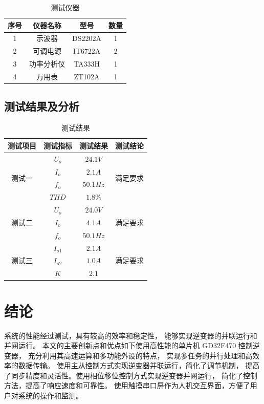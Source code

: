 \documentclass[a4paper,12pt]{article}
\begin{document}
\begin{table}[h]
    \centering
    \begin{tabular}{cccc}
    \toprule
    序号 & 仪器名称 & 型号 & 数量  \\ \midrule
    1 & 示波器 & DS2202A & 1\\
    2 & 可调电源 & IT6722A & 2 \\
    3 & 功率分析仪 & TA333H & 1 \\
    4 & 万用表 &  ZT102A & 1
    \\ \bottomrule
    \end{tabular}
    \caption{测试仪器}
\end{table}
\newpage
\subsection{测试结果及分析}
\begin{table}[h]
    \centering
    \begin{tabular}{@{}cccc@{}}
    \toprule
    测试项目 & 测试指标 & 测试结果 & 测试结论 \\ \midrule
    \multirow{4}{*}{测试一} & $U_o$ & $24.1V$ & \multirow{4}{*}{满足要求} \\
     & $I_o$ & $2.1A$ &  \\
     & $f_o$ & $50.1Hz$ &  \\
     & $THD$ & $1.8\%$ &  \\ \midrule
    \multirow{3}{*}{测试二} & $U_o$ & $24.0V$ & \multirow{3}{*}{满足要求} \\
        & $I_o$ & $4.1A$ &  \\
        & $f_o$ & $50.1Hz$ &  \\ \midrule
    \multirow{3}{*}{测试三} & $I_{o1}$ & $2.1A$ & \multirow{3}{*}{满足要求} \\
        & $I_{o2}$ & $1.0A$ &  \\
        & $K$ & $2.1$ &  \\ \bottomrule
    \end{tabular}
    \caption{测试结果}
\end{table}

\section{结论}
系统的性能经过测试，具有较高的效率和稳定性，
能够实现逆变器的并联运行和并网运行。
本文的主要创新点和优点如下使用高性能的单片机 GD32F470 控制逆变器，
充分利用其高速运算和多功能外设的特点，
实现多任务的并行处理和高效率的数据传输。
使用主从控制方式实现逆变器并联运行，简化了调节机制，
提高了同步精度和灵活性。使用相位移位控制方式实现逆变器并网运行，
简化了控制方法，提高了响应速度和可靠性。
使用触摸串口屏作为人机交互界面，方便了用户对系统的操作和监测。
\end{document}

